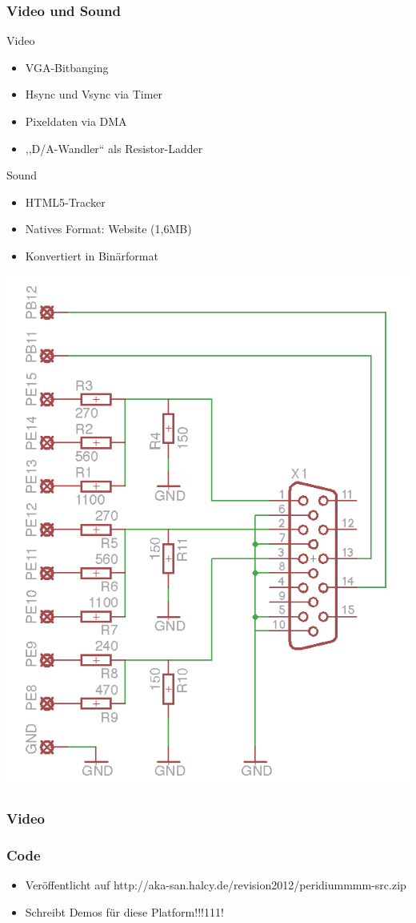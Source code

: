 \documentclass[t,14pt,aspectratio=169]{beamer}
\begin{document}
\begin{frame} %
\frametitle{Video und Sound}

\begin{minipage}{0.6\linewidth}
Video
\begin{itemize}
\item VGA-Bitbanging
\item Hsync und Vsync via Timer
\item Pixeldaten via DMA
\item ,,D/A-Wandler`` als Resistor-Ladder
\end{itemize}
Sound
\begin{itemize}
\item HTML5-Tracker
\item Natives Format: Website (1,6MB)
\item Konvertiert in Binärformat
\end{itemize}
\end{minipage}
\begin{minipage}{0.35\linewidth}
\includegraphics[width=\linewidth]{photos/schematic}
\end{minipage}
\end{frame}


\begin{frame}
\frametitle{Video}
\end{frame}

\begin{frame}
\frametitle{Code}
\begin{itemize}
\item Veröffentlicht auf http://aka-san.halcy.de/revision2012/peridiummmm-src.zip
\item Schreibt Demos für diese Platform!!!111!
\end{itemize}
\end{frame}
\end{document}
